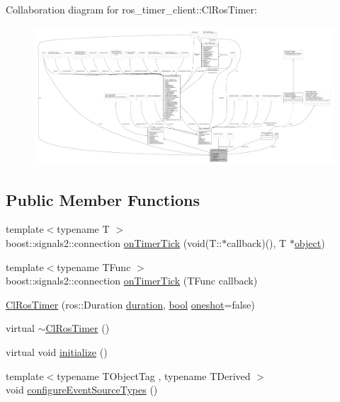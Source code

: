 Collaboration diagram for ros\+\_\+timer\+\_\+client\+:\+:Cl\+Ros\+Timer\+:
\nopagebreak
\begin{figure}[H]
\begin{center}
\leavevmode
\includegraphics[width=350pt]{classros__timer__client_1_1ClRosTimer__coll__graph}
\end{center}
\end{figure}
\subsection*{Public Member Functions}
\begin{DoxyCompactItemize}
\item 
{\footnotesize template$<$typename T $>$ }\\boost\+::signals2\+::connection \hyperlink{classros__timer__client_1_1ClRosTimer_a06ecf6427b5df59f29879ab3bd1f120c}{on\+Timer\+Tick} (void(T\+::$\ast$callback)(), T $\ast$\hyperlink{classobject}{object})
\item 
{\footnotesize template$<$typename T\+Func $>$ }\\boost\+::signals2\+::connection \hyperlink{classros__timer__client_1_1ClRosTimer_a0ad81e975f7ea9f4b8e947663109c0eb}{on\+Timer\+Tick} (T\+Func callback)
\item 
\hyperlink{classros__timer__client_1_1ClRosTimer_a7a8cde0adf8d957dc0fe20f38b6ae1bd}{Cl\+Ros\+Timer} (ros\+::\+Duration \hyperlink{classros__timer__client_1_1ClRosTimer_a79df7a52481e520ba959f3e6afb0a817}{duration}, \hyperlink{classbool}{bool} \hyperlink{classros__timer__client_1_1ClRosTimer_a767e8c7723206bd7a0a49f660418d628}{oneshot}=false)
\item 
virtual \hyperlink{classros__timer__client_1_1ClRosTimer_a099e3ba0adbd67092703bd5c776d6c3f}{$\sim$\+Cl\+Ros\+Timer} ()
\item 
virtual void \hyperlink{classros__timer__client_1_1ClRosTimer_a2d290d2a5d0afa7cdab543b17dbddbff}{initialize} ()
\item 
{\footnotesize template$<$typename T\+Object\+Tag , typename T\+Derived $>$ }\\void \hyperlink{classros__timer__client_1_1ClRosTimer_aab7de28c1ae3d58090fd6031a9b5bc54}{configure\+Event\+Source\+Types} ()
\end{DoxyCompactItemize}
